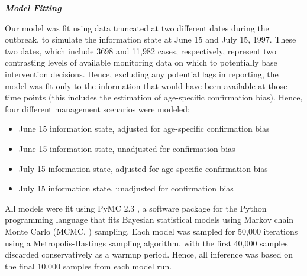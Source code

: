 \emph{\textbf{Model Fitting}}

Our model was fit using data truncated at two different dates during the
outbreak, to simulate the information state at June 15 and July 15,
1997. These two dates, which include 3698 and 11,982 cases,
respectively, represent two contrasting levels of available monitoring
data on which to potentially base intervention decisions. Hence,
excluding any potential lags in reporting, the model was fit only to the
information that would have been available at those time points (this
includes the estimation of age-specific confirmation bias). Hence, four
different management scenarios were modeled:

\begin{itemize}
\item June 15 information state, adjusted for age-specific confirmation bias
\item June 15 information state, unadjusted for confirmation bias
\item July 15 information state, adjusted for age-specific confirmation bias
\item July 15 information state, unadjusted for confirmation bias
\end{itemize}

All models were fit using PyMC 2.3 \cite{Patil_2010},
a software package for the Python programming language that fits
Bayesian statistical models using Markov chain Monte Carlo (MCMC, \cite{Geyer_2011}) sampling. Each model was sampled for 50,000
iterations using a Metropolis-Hastings sampling algorithm, with the
first 40,000 samples discarded conservatively as a warmup period. Hence,
all inference was based on the final 10,000 samples from each model run.